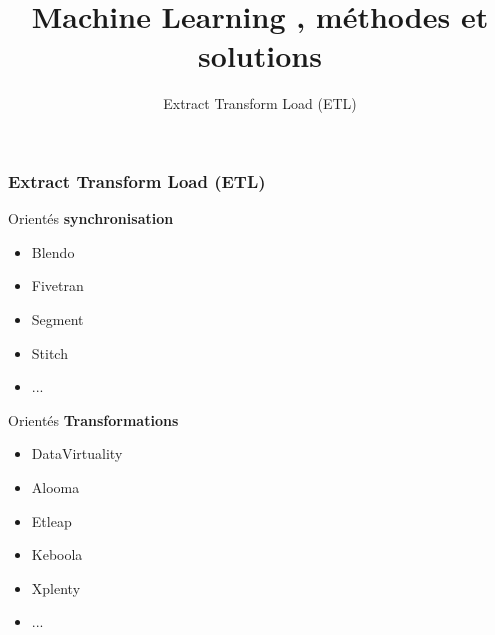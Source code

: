 \documentclass{formation}
\title{Machine Learning , méthodes et solutions}
\subtitle{Extract Transform Load (ETL)}
\begin{document}
\maketitle

\begin{frame}
  \frametitle{Extract Transform Load (ETL)}
  \begin{minipage}[l]{0.49\linewidth}
    Orientés \textbf{synchronisation}
    \begin{itemize}
    \item Blendo
    \item Fivetran
    \item Segment
    \item Stitch
    \item ...
    \end{itemize}
  \end{minipage}\hfill
  \begin{minipage}[l]{0.49\linewidth}
    Orientés \textbf{Transformations}
    \begin{itemize}
    \item DataVirtuality
    \item Alooma
    \item Etleap
    \item Keboola
    \item Xplenty
    \item ...
    \end{itemize}
  \end{minipage}\hfill
\end{frame}
\end{document}
